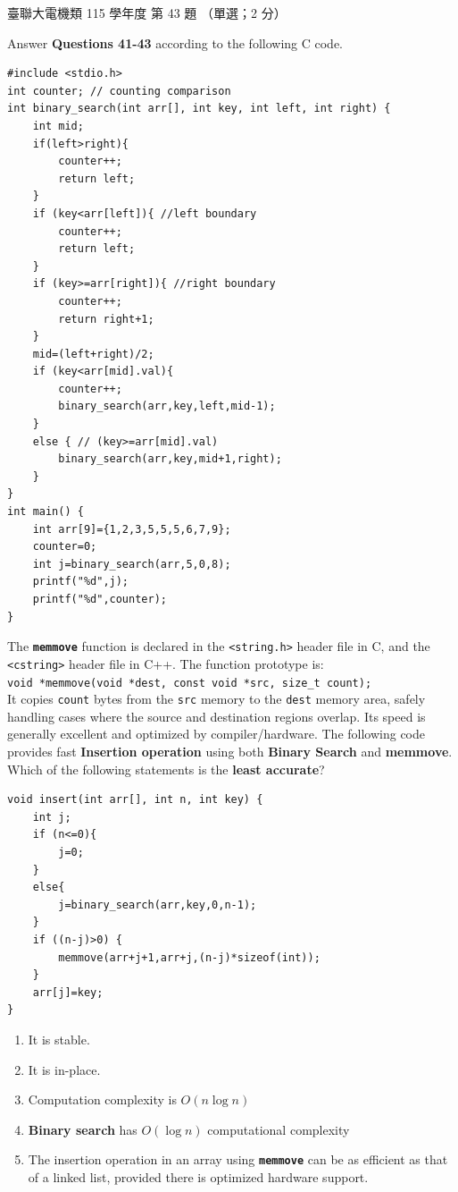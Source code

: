 \begin{pastexam}[label={px:ust-115-ee-ds-43}]{臺聯大電機類 115 學年度 第 43 題}
（單選；2 分）

Answer \textbf{Questions 41-43} according to the following C code.
\begin{verbatim}
#include <stdio.h>
int counter; // counting comparison
int binary_search(int arr[], int key, int left, int right) {
    int mid;
    if(left>right){
        counter++;
        return left;
    }
    if (key<arr[left]){ //left boundary
        counter++;
        return left;
    }
    if (key>=arr[right]){ //right boundary
        counter++;
        return right+1;
    }
    mid=(left+right)/2;
    if (key<arr[mid].val){
        counter++;
        binary_search(arr,key,left,mid-1);
    }
    else { // (key>=arr[mid].val)
        binary_search(arr,key,mid+1,right);
    }
}
int main() {
    int arr[9]={1,2,3,5,5,5,6,7,9};
    counter=0;
    int j=binary_search(arr,5,0,8);
    printf("%d",j);
    printf("%d",counter);
}
\end{verbatim}

The \texttt{\textbf{memmove}} function is declared in the \texttt{<string.h>} header file in C, and
the \texttt{<cstring>} header file in C++. The function prototype is:\\
\texttt{void *memmove(void *dest, const void *src, size\_t count);}\\
It copies \texttt{count} bytes from the \texttt{src} memory to the \texttt{dest} memory area, safely
handling cases where the source and destination regions overlap. Its speed is generally excellent
and optimized by compiler/hardware. The following code provides fast \textbf{Insertion operation}
using both \textbf{Binary Search} and \textbf{memmove}. Which of the following statements is the
\textbf{least accurate}?
\begin{verbatim}
void insert(int arr[], int n, int key) {
    int j;
    if (n<=0){
        j=0;
    }
    else{
        j=binary_search(arr,key,0,n-1);
    }
    if ((n-j)>0) {
        memmove(arr+j+1,arr+j,(n-j)*sizeof(int));
    }
    arr[j]=key;
}
\end{verbatim}
\begin{enumerate}[label=(\Alph*)]
\item It is stable.
\item It is in-place.
\item Computation complexity is $O(n \log n)$
\item \textbf{Binary search} has $O(\log n)$ computational complexity
\item The insertion operation in an array using \texttt{\textbf{memmove}} can be as efficient as
that of a linked list, provided there is optimized hardware support.
\end{enumerate}
\end{pastexam}

